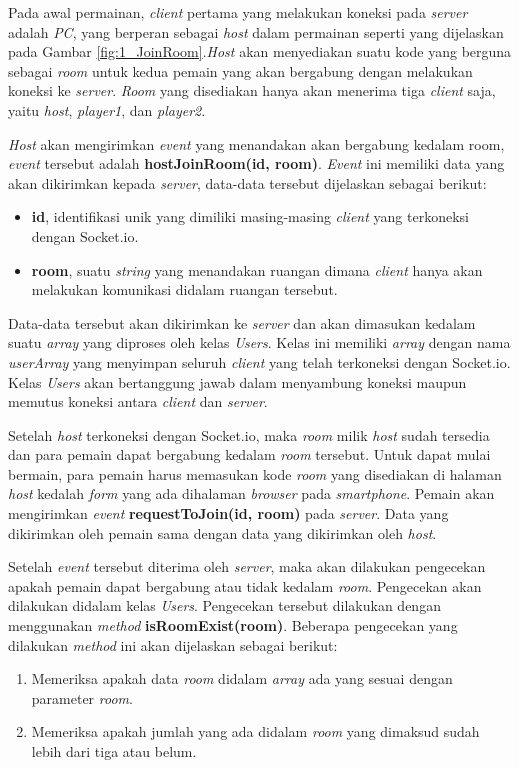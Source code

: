 Pada awal permainan, \textit{client} pertama yang melakukan koneksi pada \textit{server} adalah \textit{PC}, yang berperan sebagai \textit{host} dalam permainan seperti yang dijelaskan pada Gambar \ref{fig:1_JoinRoom}.\textit{Host} akan menyediakan suatu kode yang berguna sebagai \textit{room} untuk kedua pemain yang akan bergabung dengan melakukan koneksi ke \textit{server}. \textit{Room} yang disediakan hanya akan menerima tiga \textit{client} saja, yaitu \textit{host}, \textit{player1}, dan \textit{player2}. 

\textit{Host} akan mengirimkan \textit{event} yang menandakan akan bergabung kedalam room, \textit{event} tersebut adalah \textbf{hostJoinRoom(id, room)}. \textit{Event} ini memiliki data yang akan dikirimkan kepada \textit{server}, data-data tersebut dijelaskan sebagai berikut:
\begin{itemize}
	\item \textbf{id}, identifikasi unik yang dimiliki masing-masing \textit{client} yang terkoneksi dengan Socket.io.
	\item \textbf{room}, suatu \textit{string} yang menandakan ruangan dimana \textit{client} hanya akan melakukan komunikasi didalam ruangan tersebut.
\end{itemize}

Data-data tersebut akan dikirimkan ke \textit{server} dan akan dimasukan kedalam suatu \textit{array} yang diproses oleh kelas \textit{Users}. Kelas ini memiliki \textit{array} dengan nama \textit{userArray} yang menyimpan seluruh \textit{client} yang telah terkoneksi dengan Socket.io. Kelas \textit{Users} akan bertanggung jawab dalam menyambung koneksi maupun memutus koneksi antara \textit{client} dan \textit{server}.

Setelah \textit{host} terkoneksi dengan Socket.io, maka \textit{room} milik \textit{host} sudah tersedia dan para pemain dapat bergabung kedalam \textit{room} tersebut. Untuk dapat mulai bermain, para pemain harus memasukan kode \textit{room} yang disediakan di halaman \textit{host} kedalah \textit{form} yang ada dihalaman \textit{browser} pada \textit{smartphone}. Pemain akan mengirimkan \textit{event} \textbf{requestToJoin(id, room)} pada \textit{server}. Data yang dikirimkan oleh pemain sama dengan data yang dikirimkan oleh \textit{host}. 

Setelah \textit{event} tersebut diterima oleh \textit{server}, maka akan dilakukan pengecekan apakah pemain dapat bergabung atau tidak kedalam \textit{room}. Pengecekan akan dilakukan didalam kelas \textit{Users}. Pengecekan tersebut dilakukan dengan menggunakan \textit{method} \textbf{isRoomExist(room)}. Beberapa pengecekan yang dilakukan \textit{method} ini akan dijelaskan sebagai berikut:
\begin{enumerate}
	\item Memeriksa apakah data \textit{room} didalam \textit{array} ada yang sesuai dengan parameter \textit{room}.
	\item Memeriksa apakah jumlah yang ada didalam \textit{room} yang dimaksud sudah lebih dari tiga atau belum.
\end{enumerate}

